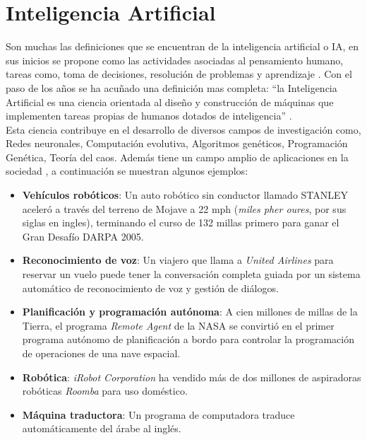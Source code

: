 

\section{Inteligencia Artificial}

Son muchas las definiciones que se encuentran de la inteligencia artificial o IA, en sus inicios se propone como las  actividades asociadas al pensamiento humano, tareas como, toma de decisiones, resolución de problemas y aprendizaje \citep{CT19}. Con el paso de los años se ha acuñado una definición mas completa: ``la Inteligencia Artificial es una ciencia orientada al diseño y construcción de máquinas que implementen tareas propias de humanos dotados de inteligencia'' \citep{CT1}.\\


Esta ciencia contribuye en el desarrollo de diversos campos de investigación como, Redes neuronales, Computación evolutiva, Algoritmos genéticos, Programación Genética, Teoría del caos. Además tiene un campo amplio de aplicaciones en la sociedad \citep{CT20}, a continuación se muestran algunos ejemplos:

\begin{itemize}

	\item \textbf{Vehículos robóticos}: Un auto robótico sin conductor llamado STANLEY aceleró a través del terreno de Mojave a 22 mph (\textit{miles pher oures}, por sus siglas en ingles), terminando el curso de 132 millas primero para ganar el Gran Desafío DARPA 2005.

	\item \textbf{Reconocimiento de voz}: Un viajero que llama a \textit{United Airlines} para reservar un vuelo puede tener la conversación completa guiada por un sistema automático de reconocimiento de voz y gestión de diálogos.

	\item \textbf{Planificación y programación autónoma}: A cien millones de millas de la Tierra, el programa \textit{Remote Agent} de la NASA se convirtió en el primer programa autónomo de planificación a bordo para controlar la programación de operaciones de una nave espacial.

	\item \textbf{Robótica}: \textit{iRobot Corporation} ha vendido más de dos millones de aspiradoras robóticas \textit{Roomba} para uso doméstico.

	\item \textbf{Máquina traductora}: Un programa de computadora  traduce automáticamente del árabe al inglés.

\end{itemize} 


